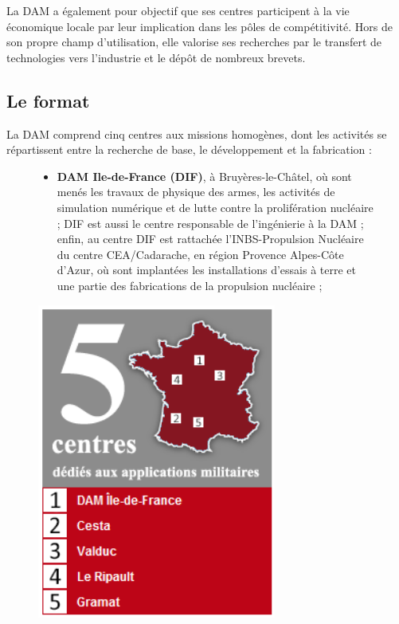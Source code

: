 \documentclass[12pt,a4paper,twoside]{article}
\begin{document}
    La DAM a également pour objectif que ses centres participent à la vie économique
    locale par leur implication dans les pôles de compétitivité. Hors de son propre
    champ d'utilisation, elle valorise ses recherches par le transfert de
    technologies vers l'industrie et le dépôt de nombreux brevets.

    \subsection*{Le format}
    La DAM comprend cinq centres aux missions homogènes, dont les activités se
    répartissent entre la recherche de base, le développement et la fabrication :
    \begin{figure}[!ht]
        \begin{minipage}{0.6\linewidth}
            \begin{itemize}[label=\textbullet]
                \item
                {\bf DAM Ile-de-France (DIF)}, à Bruyères-le-Châtel, où sont
                menés les travaux de physique des armes, les activités de
                simulation numérique et de lutte contre la prolifération
                nucléaire ; DIF est aussi le centre responsable de l'ingénierie
                à la DAM ; enfin, au centre DIF est rattachée l'INBS-Propulsion
                Nucléaire du centre CEA/Cadarache, en région Provence Alpes-Côte
                d'Azur, où sont implantées les installations d'essais à terre et
                une partie des fabrications de la propulsion nucléaire ;
            \end{itemize}
        \end{minipage}
        \begin{minipage}{0.4\linewidth}
            \centering
            \includegraphics[width=0.7\textwidth]{ressources/images/dam/5_centres.png}
        \end{minipage}
    \end{figure}
\end{document}
